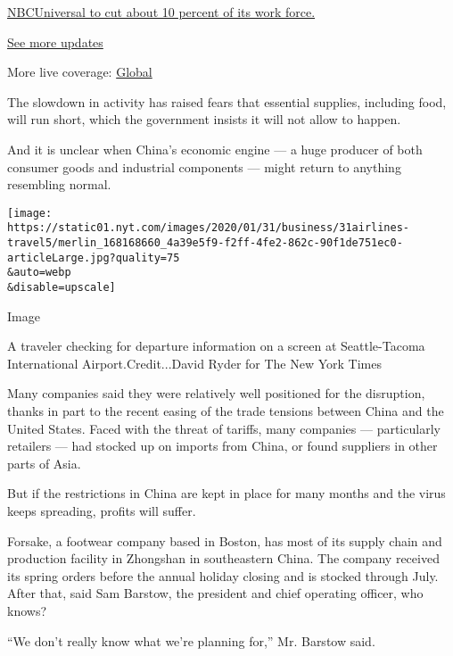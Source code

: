 \href{https://www.nytimes.com/live/2020/08/04/business/stock-market-today-coronavirus?action=click\&pgtype=Article\&state=default\&region=MAIN_CONTENT_1\&context=storylines_live_updates\#nbcuniversal-to-cut-about-10-percent-of-its-work-force}{NBCUniversal
to cut about 10 percent of its work force.}

\href{https://www.nytimes.com/live/2020/08/04/business/stock-market-today-coronavirus?action=click\&pgtype=Article\&state=default\&region=MAIN_CONTENT_1\&context=storylines_live_updates}{See
more updates}

More live coverage:
\href{https://www.nytimes.com/2020/08/04/world/coronavirus-cases.html?action=click\&pgtype=Article\&state=default\&region=MAIN_CONTENT_1\&context=storylines_live_updates}{Global}

The slowdown in activity has raised fears that essential supplies,
including food, will run short, which the government insists it will not
allow to happen.

And it is unclear when China's economic engine --- a huge producer of
both consumer goods and industrial components --- might return to
anything resembling normal.

\texttt{[image: https://static01.nyt.com/images/2020/01/31/business/31airlines-travel5/merlin\_168168660\_4a39e5f9-f2ff-4fe2-862c-90f1de751ec0-articleLarge.jpg?quality=75\\\&auto=webp\\\&disable=upscale]}

Image

A traveler checking for departure information on a screen at
Seattle-Tacoma International Airport.Credit...David Ryder for The New
York Times

Many companies said they were relatively well positioned for the
disruption, thanks in part to the recent easing of the trade tensions
between China and the United States. Faced with the threat of tariffs,
many companies --- particularly retailers --- had stocked up on imports
from China, or found suppliers in other parts of Asia.

But if the restrictions in China are kept in place for many months and
the virus keeps spreading, profits will suffer.

Forsake, a footwear company based in Boston, has most of its supply
chain and production facility in Zhongshan in southeastern China. The
company received its spring orders before the annual holiday closing and
is stocked through July. After that, said Sam Barstow, the president and
chief operating officer, who knows?

``We don't really know what we're planning for,'' Mr. Barstow said.

